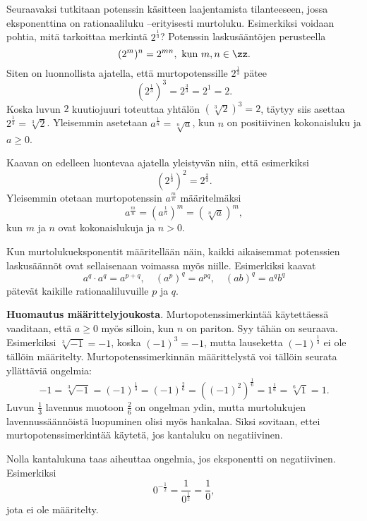 Seuraavaksi tutkitaan potenssin käsitteen laajentamista tilanteeseen, jossa eksponenttina on rationaaliluku –erityisesti murtoluku.
Esimerkiksi voidaan pohtia, mitä tarkoittaa merkintä $2^\frac{1}{3}$? Potenssin laskusääntöjen perusteella
\[
(2^{m})^n = 2^{mn},\textrm{ kun }m,n\in \zz.
\]
Siten on luonnollista ajatella, että murtopotenssille $2^\frac{1}{3}$ pätee
\[
(2^\frac{1}{3})^3 = 2^\frac{3}{3} = 2^1=2.
\]
Koska luvun $2$ kuutiojuuri toteuttaa yhtälön $(\sqrt[3]{2})^3=2$, täytyy siis asettaa $2^\frac{1}{3}=\sqrt[3]{2}$. Yleisemmin asetetaan $a^\frac{1}{n} =\sqrt[n]{a}$, kun $n$ on positiivinen kokonaisluku ja $a\ge 0$.

Kaavan on edelleen luontevaa ajatella yleistyvän niin, että esimerkiksi
\[
(2^{\frac{1}{3}})^2 = 2^{\frac{2}{3}}.
\]
Yleisemmin otetaan murtopotenssin $a^\frac{m}{n}$ määritelmäksi
\[
a^\frac{m}{n} = (a^{\frac{1}{n}})^m = (\sqrt[n]{a})^m,
\]
kun $m$ ja $n$ ovat kokonaislukuja ja $n>0$. 



Kun murtolukueksponentit määritellään näin, kaikki aikaisemmat potenssien
laskusäännöt ovat sellaisenaan voimassa myös niille. Esimerkiksi kaavat
\[ a^q\cdot a^q = a^{p+q}, \quad (a^p)^q = a^{pq}, \quad (ab)^q=a^qb^q \]
pätevät kaikille rationaaliluvuille $p$ ja $q$.


{\bf Huomautus määrittelyjoukosta}. Murtopotenssimerkintää käytettäessä vaaditaan, että $a\geq 0$ myös silloin, kun $n$ on pariton. Syy tähän on seuraava. Esimerkiksi $\sqrt[3]{-1}=-1$, koska $(-1)^3=-1$, mutta lauseketta $(-1)^\frac{1}{3}$ ei ole tällöin määritelty. Murtopotenssimerkinnän määrittelystä voi tällöin seurata yllättäviä ongelmia:
\[
 -1 = \sqrt[3]{-1} = (-1)^\frac{1}{3} = (-1)^\frac{2}{6}
= ((-1)^2)^\frac{1}{6} = 1^\frac{1}{6} = \sqrt[6]{1} = 1. 
\]
Luvun $\frac{1}{3}$ lavennus muotoon $\frac{2}{6}$ on ongelman ydin, mutta murtolukujen lavennussäännöistä luopuminen olisi myös hankalaa. Siksi sovitaan, ettei murtopotenssimerkintää käytetä, jos kantaluku on negatiivinen.

Nolla kantalukuna taas aiheuttaa ongelmia, jos eksponentti on negatiivinen. Esimerkiksi
\[
 0^{-\tfrac{1}{2}}=\frac{1}{0^\frac{1}{2}}=\frac{1}{0}, %
\]
jota ei ole määritelty.

